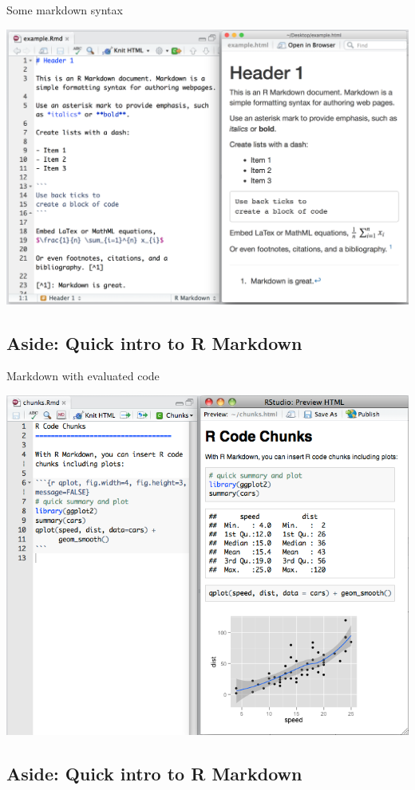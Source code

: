 \documentclass[
  letterpaper,
  DIV=11,
  numbers=noendperiod]{scrartcl}
\begin{document}
Some markdown syntax

\includegraphics{img/markdown_ex.png}

\subsection{Aside: Quick intro to R
Markdown}\label{aside-quick-intro-to-r-markdown-1}

Markdown with evaluated code

\includegraphics{img/rcode_ex.png}

\subsection{Aside: Quick intro to R
Markdown}\label{aside-quick-intro-to-r-markdown-2}
\end{document}
